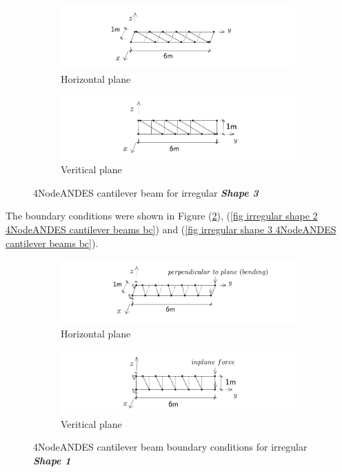 \documentclass[fleqn,11pt]{article}
\begin{document}
\begin{figure}[H]
  \centering
    \begin{subfigure}{0.5\textwidth}
      \centering
      \includegraphics[width=9cm]{../Figure-files/beam_ANDES_xy_bending_pureshape3.pdf}
      \caption{Horizontal plane}
    \end{subfigure}
    \begin{subfigure}{0.5\textwidth}
      \centering
      \includegraphics[width=9cm]{../Figure-files/beam_ANDES_yz_inPlane_pureshape3.pdf}
      \caption{Veritical  plane}
    \end{subfigure}
  \caption{4NodeANDES cantilever beam for irregular \textbf{\emph{Shape 3}} }
  \label{fig irregular shape 3 4NodeANDES cantilever beams }
\end{figure}






The boundary conditions were shown in Figure (\ref{fig irregular shape 1 4NodeANDES cantilever beams bc}), (\ref{fig irregular shape 2 4NodeANDES cantilever beams bc}) and (\ref{fig irregular shape 3 4NodeANDES cantilever beams bc}).



\begin{figure}[H]
  \centering
    \begin{subfigure}{0.5\textwidth}
      \centering
      \includegraphics[width=9cm]{../Figure-files/beam_ANDES_xy_bending_shape1.pdf}
      \caption{Horizontal plane}
    \end{subfigure}
    \begin{subfigure}{0.5\textwidth}
      \centering
      \includegraphics[width=9cm]{../Figure-files/beam_ANDES_yz_inPlane_shape1.pdf}
      \caption{Veritical  plane}
    \end{subfigure}
      \captionsetup{justification=centering,margin=3cm}
  \caption{4NodeANDES cantilever beam boundary conditions for irregular \textbf{\emph{Shape 1}} }
  \label{fig irregular shape 1 4NodeANDES cantilever beams bc}
\end{figure}
\end{document}
